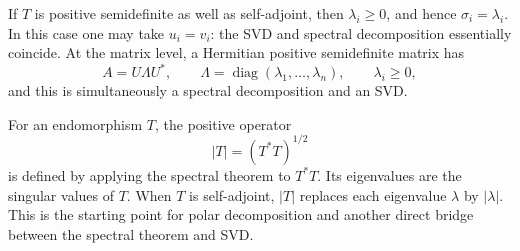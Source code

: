 If \(T\) is positive semidefinite as well as self-adjoint, then
\(\lambda_i\geq0\), and hence \(\sigma_i=\lambda_i\).  In this case one
may take \(u_i=v_i\): the SVD and spectral decomposition essentially
coincide.  At the matrix level, a Hermitian positive semidefinite matrix has
\[
A=U\Lambda U^*,
\qquad
\Lambda=\operatorname{diag}(\lambda_1,\ldots,\lambda_n),
\qquad
\lambda_i\geq0,
\]
and this is simultaneously a spectral decomposition and an SVD.

\begin{remark}
For an endomorphism \(T\), the positive operator
\[
|T|=(T^*T)^{1/2}
\]
is defined by applying the spectral theorem to \(T^*T\).  Its eigenvalues
are the singular values of \(T\).  When \(T\) is self-adjoint, \(|T|\)
replaces each eigenvalue \(\lambda\) by \(|\lambda|\).  This is the
starting point for polar decomposition and another direct bridge between the
spectral theorem and SVD.
\end{remark}

